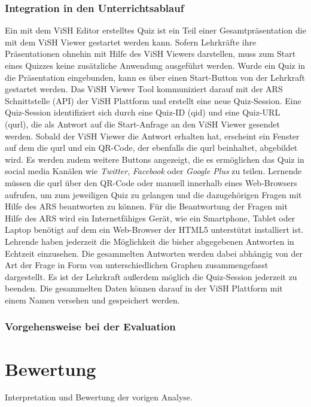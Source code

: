 \documentclass[conference]{IEEEtran}
\begin{document}
\subsubsection{Integration in den Unterrichtsablauf}
Ein mit dem ViSH Editor erstelltes Quiz ist ein Teil einer Gesamtpräsentation die mit dem ViSH Viewer gestartet werden kann. Sofern Lehrkräfte ihre Präsentationen ohnehin mit Hilfe des ViSH Viewers darstellen, muss zum Start eines Quizzes keine zusätzliche Anwendung ausgeführt werden. Wurde ein Quiz in die Präsentation eingebunden, kann es über einen Start-Button von der Lehrkraft gestartet werden. Das ViSH Viewer Tool kommuniziert darauf mit der ARS Schnittstelle (API) der ViSH Plattform und erstellt eine neue Quiz-Session. Eine Quiz-Session identifiziert sich durch eine Quiz-ID (qid) und eine Quiz-URL (qurl), die als Antwort auf die Start-Anfrage an den ViSH Viewer gesendet werden. Sobald der ViSH Viewer die Antwort erhalten hat, erscheint ein Fenster auf dem die qurl und ein QR-Code, der ebenfalls die qurl beinhaltet, abgebildet wird. Es werden zudem weitere Buttons angezeigt, die es ermöglichen das Quiz in social media Kanälen wie \emph{Twitter}, \emph{Facebook} oder \emph{Google Plus} zu teilen. Lernende müssen die qurl über den QR-Code oder manuell innerhalb eines Web-Browsers aufrufen, um zum jeweiligen Quiz zu gelangen und die dazugehörigen Fragen mit Hilfe des ARS beantworten zu können. Für die Beantwortung der Fragen mit Hilfe des ARS wird ein Internetfähiges Gerät, wie ein Smartphone, Tablet oder Laptop benötigt auf dem ein Web-Browser der HTML5 unterstützt installiert ist. Lehrende haben jederzeit die Möglichkeit die bisher abgegebenen Antworten in Echtzeit einzusehen. Die gesammelten Antworten werden dabei abhängig von der Art der Frage in Form von unterschiedlichen Graphen zusammengefasst dargestellt. Es ist der Lehrkraft außerdem möglich die Quiz-Session jederzeit zu beenden. Die gesammelten Daten können darauf in der ViSH Plattform mit einem Namen versehen und gespeichert werden. \cite[p. 6f]{Gordillo2015}

\subsubsection{Vorgehensweise bei der Evaluation}

\section{Bewertung}
Interpretation und Bewertung der vorigen Analyse.
\end{document}
